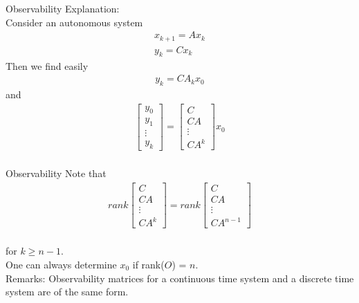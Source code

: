 \begin{frame}{Observability}
Explanation:\\
Consider an autonomous system
\begin{align*}
x_{k+1}=Ax_k\\
y_k=Cx_k
\end{align*}
\vspace{-0.2cm}
Then we find easily
    \begin{align*}
    y_k=CA_kx_0
    \end{align*}
and
    \begin{align*}
        \begin{bmatrix}
             y_0\\
             y_1\\
             \vdots\\
             y_k
        \end{bmatrix}
=   \begin{bmatrix}
             C\\
             CA\\
             \vdots\\
             CA^{k}
        \end{bmatrix}x_0\\
    \end{align*}
\end{frame}

\begin{frame}{Observability}
Note that
\begin{align*}
        rank\begin{bmatrix}
             C\\
             CA\\
             \vdots\\
             CA^{k}
        \end{bmatrix}
=   rank\begin{bmatrix}
             C\\
             CA\\
             \vdots\\
             CA^{n-1}
        \end{bmatrix}\\
    \end{align*}

for $k \geq n-1$.\\
One can always determine $x_0$ if rank($O$) = $n$.\\
Remarks: Observability matrices for a continuous time system
and a discrete time system are of the same form.
\end{frame}

